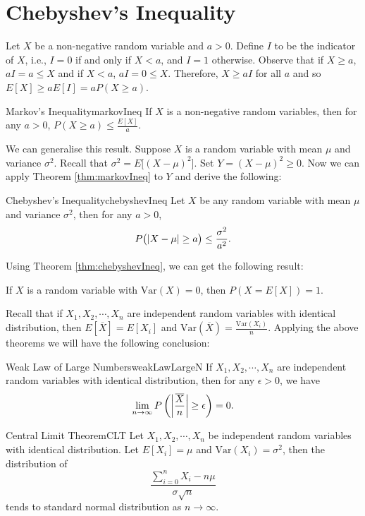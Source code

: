 \documentclass[math]{amznotes}
\theoremstyle{remark}
\begin{document}
\section{Chebyshev's Inequality}
Let $X$ be a non-negative random variable and $a > 0$. Define $I$ to be the indicator of $X$, i.e., $I = 0$ if and only if $X < a$, and $I = 1$ otherwise. Observe that if $X \geq a$, $aI = a \leq X$ and if $X < a$, $aI = 0 \leq X$. Therefore, $X \geq aI$ for all $a$ and so $E[X] \geq aE[I] = aP(X \geq a)$.
\begin{thmbox}{Markov's Inequality}{markovIneq}
    If $X$ is a non-negative random variables, then for any $a > 0$, $P(X \geq a) \leq \frac{E[X]}{a}$.
\end{thmbox}
We can generalise this result. Suppose $X$ is a random variable with mean $\mu$ and variance $\sigma^2$. Recall that $\sigma^2 = E\bigl[(X - \mu)^2\bigr]$. Set $Y = (X - \mu)^2 \geq 0$. Now we can apply Theorem \ref{thm:markovIneq} to $Y$ and derive the following:
\begin{thmbox}{Chebyshev's Inequality}{chebyshevIneq}
    Let $X$ be any random variable with mean $\mu$ and variance $\sigma^2$, then for any $a > 0$,
    \begin{equation*}
        P\bigl({\left\lvert {X - \mu} \right\rvert} \geq a\bigr) \leq \frac{\sigma^2}{a^2}.
    \end{equation*}
\end{thmbox}
Using Theorem \ref{thm:chebyshevIneq}, we can get the following result:
\begin{corbox}{}{}
    If $X$ is a random variable with $\mathrm{Var}(X) = 0$, then $P(X = E[X]) = 1$.
\end{corbox}
Recall that if $X_1, X_2, \cdots, X_n$ are independent random variables with identical distribution, then $E\left[\overline{X}\right] = E[X_i]$ and $\mathrm{Var}\left(\overline{X}\right) = \frac{\mathrm{Var}(X_i)}{n}$. Applying the above theorems we will have the following conclusion:
\begin{thmbox}{Weak Law of Large Numbers}{weakLawLargeN}
    If $X_1, X_2, \cdots, X_n$ are independent random variables with identical distribution, then for any $\epsilon > 0$, we have
    \begin{equation*}
        \lim_{n \to \infty}P\left({\left\lvert {\frac{\overline{X}}{n}} \right\rvert} \geq \epsilon\right) = 0.
    \end{equation*}
\end{thmbox}
\begin{thmbox}{Central Limit Theorem}{CLT}
    Let $X_1, X_2, \cdots, X_n$ be independent random variables with identical distribution. Let $E[X_i] = \mu$ and $\mathrm{Var}(X_i) = \sigma^2$, then the distribution of
    \begin{equation*}
        \frac{\sum_{i = 0}^{n}X_i - n\mu}{\sigma\sqrt{n}}
    \end{equation*}
    tends to standard normal distribution as $n \to \infty$.
\end{thmbox}
\end{document}

